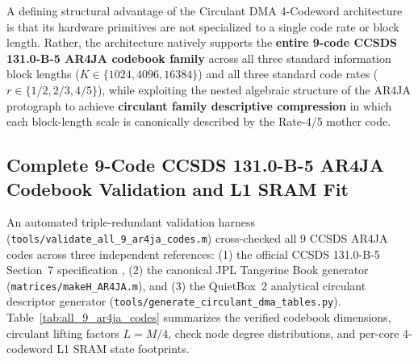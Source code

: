 \documentclass[10pt]{article}
\begin{document}
A defining structural advantage of the Circulant DMA 4-Codeword architecture is that its hardware primitives are not specialized to a single code rate or block length. Rather, the architecture natively supports the \textbf{entire 9-code CCSDS 131.0-B-5 AR4JA codebook family} across all three standard information block lengths ($K \in \{1024, 4096, 16384\}$) and all three standard code rates ($r \in \{1/2, 2/3, 4/5\}$), while exploiting the nested algebraic structure of the AR4JA protograph to achieve \textbf{circulant family descriptive compression} in which each block-length scale is canonically described by the Rate-4/5 mother code.

\subsection{Complete 9-Code CCSDS 131.0-B-5 AR4JA Codebook Validation and L1 SRAM Fit}

An automated triple-redundant validation harness (\texttt{tools/validate\_all\_9\_ar4ja\_codes.m}) cross-checked all 9 CCSDS AR4JA codes across three independent references: (1) the official CCSDS 131.0-B-5 Section~7 specification \cite{ccsds_tm_coding}, (2) the canonical JPL Tangerine Book generator (\texttt{matrices/makeH\_AR4JA.m}), and (3) the QuietBox~2 analytical circulant descriptor generator (\texttt{tools/generate\_circulant\_dma\_tables.py}). Table~\ref{tab:all_9_ar4ja_codes} summarizes the verified codebook dimensions, circulant lifting factors $L = M/4$, check node degree distributions, and per-core 4-codeword L1 SRAM state footprints.
\end{document}
